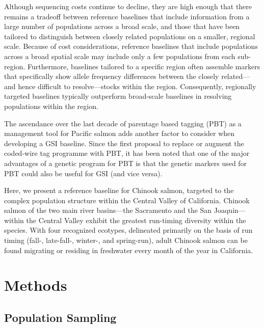 Although sequencing costs continue to decline, they are high enough
that there remains a tradeoff
between reference baselines that include information from a large number of
populations across a broad scale, and those that have been tailored
to distinguish between closely related populations on a smaller, regional scale.
Because of cost considerations, reference baselines that include populations across a broad 
spatial scale may include only a few populations from each sub-region.  Furthermore,
baselines tailored to a specific region often assemble markers that specifically
show allele frequency differences between the closely related---and hence difficult
to resolve---stocks within the region.  Consequently, regionally targeted baselines typically
outperform broad-scale baselines in resolving populations within the region.

The ascendance over the last decade of parentage based tagging (PBT) as a management
tool for Pacific salmon adds another factor to consider when developing a GSI baseline.
Since the first proposal \citep{anderson2005description} to replace or augment the coded-wire tag
programme \citep{nandor2010overview}
with PBT, it has been noted that one of the major advantages of a genetic program for
PBT is that the genetic markers used for PBT could also be useful for GSI (and
vice versa).

Here, we present a reference baseline for Chinook salmon, targeted to the complex population 
structure within the Central Valley of California. Chinook salmon of the two main river basins---the 
Sacramento and the San Joaquin---within the Central Valley exhibit the greatest run-timing diversity
within the species.  With four recognized ecotypes, delineated primarily on the basis of run timing
(fall-, late-fall-, winter-, and spring-run), adult Chinook salmon can be found migrating or residing
in freshwater every month of the year in California. 


 \section*{Methods}


\subsection*{Population Sampling}

